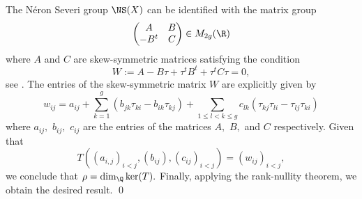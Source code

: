 \documentclass[11pt,leqno]{article}
\theoremstyle{definition}
\renewenvironment{proof}{{\bfseries \noindent Proof} }{ \qed \\}
\begin{document}
\begin{proof}
The Néron Severi group $\NS(X)$ can be identified with the matrix group 
\begin{equation*}
    \begin{pmatrix}
        A & B \\
        -B^{t} & C
    \end{pmatrix}
    \in M_{2g}(\R)
\end{equation*}
 where $A$ and $C$ are skew-symmetric matrices satisfying the condition 
 $$W:=A-B\tau+\tau^tB^t+\tau^tC\tau=0,$$ 
 see \cite[Proposition 1.3.4]{birkenhake1999complex}. The entries of the skew-symmetric matrix $W$ are explicitly given by
 $$
w_{ij}=a_{ij}+\sum_{k=1}^g(b_{jk}\tau_{ki}-b_{ik}\tau_{kj})+\sum_{1\leq l< k\leq g}c_{lk}(\tau_{kj}\tau_{li}-\tau_{lj}\tau_{ki})
 $$
where $a_{ij},$ $b_{ij},$ $c_{ij}$ are the entries of the matrices $A,$ $B,$ and $C$ respectively. Given that
$$
T((a_{i,j})_{i<j},(b_{ij}),(c_{ij})_{i<j})=(w_{ij})_{i<j},
$$
we conclude that $\rho=\dim_\Q \ker(T).$ Finally, applying the rank-nullity theorem, we obtain the desired result.   
\end{proof}
\end{document}
